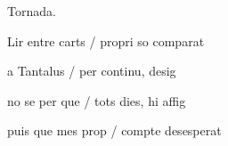 \documentclass[12pt]{article}
\begin{document}
\begin{estrofaExtra}%




\begin{tornada}

Tornada.

\end{tornada}


\end{estrofaExtra}


\begin{estrofa}

 Lir entre carts / propri so comparat

 a Tantalus / per continu, desig

 no se per que / tots dies, hi affig

 puis que mes prop / compte desesperat

\end{estrofa}
\end{document}
